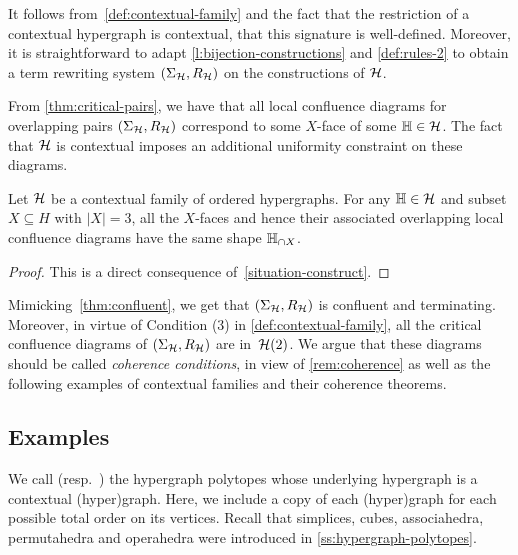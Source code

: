 It follows from~\cref{def:contextual-family} and the fact that the restriction of a contextual hypergraph is contextual, that this signature is well-defined.
Moreover, it is straightforward to adapt \cref{l:bijection-constructions} and \cref{def:rules-2} to obtain a term rewriting system $(\Sigma_{\mathcal{H}},R_{\mathcal{H}})$ on the constructions of $\mathcal{H}$. 

From \cref{thm:critical-pairs}, we have that all local confluence diagrams for overlapping pairs $(\Sigma_{\mathcal{H}},R_{\mathcal{H}})$ correspond to some $X$-face of some ${\mathbb H} \in \mathcal{H}$.
The fact that $\mathcal{H}$ is contextual imposes an additional uniformity constraint on these diagrams.

\begin{thm}
Let $\mathcal{H}$ be a contextual family of ordered hypergraphs.
For any ${\mathbb H} \in \mathcal{H}$ and subset $X \subseteq H$ with $|X|=3$, all the $X$-faces and hence their associated  overlapping local confluence diagrams 
have the same shape ${\mathbb H}_{\cap X}$. 
\end{thm}

\begin{proof} 
This is a direct consequence of~\cref{situation-construct}.
\end{proof}

Mimicking~\cref{thm:confluent}, we get that $(\Sigma_{\mathcal{H}},R_{\mathcal{H}})$ is confluent and terminating.
Moreover, in virtue of Condition (3) in \cref{def:contextual-family}, all the critical confluence diagrams of $(\Sigma_{\mathcal{H}},R_{\mathcal{H}})$ are in~$\mathcal{H}(2)$.
We argue that these diagrams should be called \emph{coherence conditions}, in view of \cref{rem:coherence} as well as the following examples of contextual families and their coherence theorems. 


\subsection{Examples}
\label{ss:examples}

We call  (resp.\ ) the hypergraph polytopes whose underlying hypergraph is a contextual (hyper)graph.
Here, we include a copy of each (hyper)graph for each possible total order on its vertices.
Recall that simplices, cubes, associahedra, permutahedra and operahedra were introduced in \cref{ss:hypergraph-polytopes}.


